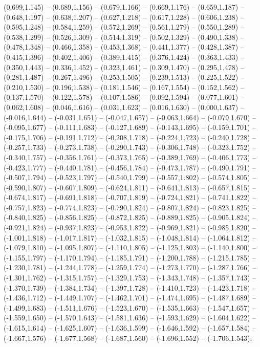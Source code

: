 (0.699,1.145) -- (0.689,1.156) -- (0.679,1.166) -- (0.669,1.176) -- (0.659,1.187) -- (0.648,1.197) -- (0.638,1.207) -- (0.627,1.218) -- (0.617,1.228) -- (0.606,1.238) -- (0.595,1.248) -- (0.584,1.259) -- (0.572,1.269) -- (0.561,1.279) -- (0.550,1.289) -- (0.538,1.299) -- (0.526,1.309) -- (0.514,1.319) -- (0.502,1.329) -- (0.490,1.338) -- (0.478,1.348) -- (0.466,1.358) -- (0.453,1.368) -- (0.441,1.377) -- (0.428,1.387) -- (0.415,1.396) -- (0.402,1.406) -- (0.389,1.415) -- (0.376,1.424) -- (0.363,1.433) -- (0.350,1.443) -- (0.336,1.452) -- (0.323,1.461) -- (0.309,1.470) -- (0.295,1.478) -- (0.281,1.487) -- (0.267,1.496) -- (0.253,1.505) -- (0.239,1.513) -- (0.225,1.522) -- (0.210,1.530) -- (0.196,1.538) -- (0.181,1.546) -- (0.167,1.554) -- (0.152,1.562) -- (0.137,1.570) -- (0.122,1.578) -- (0.107,1.586) -- (0.092,1.594) -- (0.077,1.601) -- (0.062,1.608) -- (0.046,1.616) -- (0.031,1.623) -- (0.016,1.630) -- (0.000,1.637) -- (-0.016,1.644) -- (-0.031,1.651) -- (-0.047,1.657) -- (-0.063,1.664) -- (-0.079,1.670) -- (-0.095,1.677) -- (-0.111,1.683) -- (-0.127,1.689) -- (-0.143,1.695) -- (-0.159,1.701) -- (-0.175,1.706) -- (-0.191,1.712) -- (-0.208,1.718) -- (-0.224,1.723) -- (-0.240,1.728) -- (-0.257,1.733) -- (-0.273,1.738) -- (-0.290,1.743) -- (-0.306,1.748) -- (-0.323,1.752) -- (-0.340,1.757) -- (-0.356,1.761) -- (-0.373,1.765) -- (-0.389,1.769) -- (-0.406,1.773) -- (-0.423,1.777) -- (-0.440,1.781) -- (-0.456,1.784) -- (-0.473,1.787) -- (-0.490,1.791) -- (-0.507,1.794) -- (-0.523,1.797) -- (-0.540,1.799) -- (-0.557,1.802) -- (-0.574,1.805) -- (-0.590,1.807) -- (-0.607,1.809) -- (-0.624,1.811) -- (-0.641,1.813) -- (-0.657,1.815) -- (-0.674,1.817) -- (-0.691,1.818) -- (-0.707,1.819) -- (-0.724,1.821) -- (-0.741,1.822) -- (-0.757,1.823) -- (-0.774,1.823) -- (-0.790,1.824) -- (-0.807,1.824) -- (-0.823,1.825) -- (-0.840,1.825) -- (-0.856,1.825) -- (-0.872,1.825) -- (-0.889,1.825) -- (-0.905,1.824) -- (-0.921,1.824) -- (-0.937,1.823) -- (-0.953,1.822) -- (-0.969,1.821) -- (-0.985,1.820) -- (-1.001,1.818) -- (-1.017,1.817) -- (-1.032,1.815) -- (-1.048,1.814) -- (-1.064,1.812) -- (-1.079,1.810) -- (-1.095,1.807) -- (-1.110,1.805) -- (-1.125,1.803) -- (-1.140,1.800) -- (-1.155,1.797) -- (-1.170,1.794) -- (-1.185,1.791) -- (-1.200,1.788) -- (-1.215,1.785) -- (-1.230,1.781) -- (-1.244,1.778) -- (-1.259,1.774) -- (-1.273,1.770) -- (-1.287,1.766) -- (-1.301,1.762) -- (-1.315,1.757) -- (-1.329,1.753) -- (-1.343,1.748) -- (-1.357,1.743) -- (-1.370,1.739) -- (-1.384,1.734) -- (-1.397,1.728) -- (-1.410,1.723) -- (-1.423,1.718) -- (-1.436,1.712) -- (-1.449,1.707) -- (-1.462,1.701) -- (-1.474,1.695) -- (-1.487,1.689) -- (-1.499,1.683) -- (-1.511,1.676) -- (-1.523,1.670) -- (-1.535,1.663) -- (-1.547,1.657) -- (-1.559,1.650) -- (-1.570,1.643) -- (-1.581,1.636) -- (-1.593,1.629) -- (-1.604,1.622) -- (-1.615,1.614) -- (-1.625,1.607) -- (-1.636,1.599) -- (-1.646,1.592) -- (-1.657,1.584) -- (-1.667,1.576) -- (-1.677,1.568) -- (-1.687,1.560) -- (-1.696,1.552) -- (-1.706,1.543);
